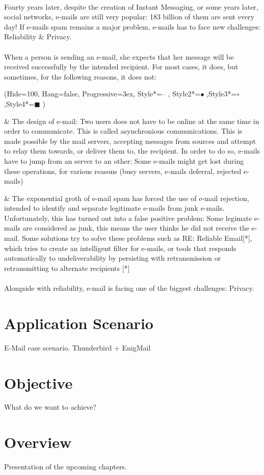 \paragraph{}
Fourty years later, despite the creation of Instant Messaging, or some years later, social networks, e-mails are still very popular: 183 billion of them are sent every day! If e-mails spam remains a major problem, e-mails has to face new challenges: Reliability \& Privacy. 
\paragraph{}
When a person is sending an e-mail, she expects that her message will be received successfully by the
intended recipient. For most cases, it does, but sometimes, for the following reasons, it does not:
\begin{easylist}[enumerate]
\ListProperties(Hide=100, Hang=false, Progressive=3ex, Style*=-- ,
Style2*=$\bullet$ ,Style3*=$\circ$ ,Style4*=\tiny$\blacksquare$ )

& The design of e-mail: Two users does not have to be online at the same time in order to communicate. This is called asynchronious communications. This is made possible by the mail servers, accepting messages from sources and attempt to relay them towards, or deliver them to, the recipient. In order to do so, e-mails have to jump from an server to an other: Some e-mails might get lost during these operations, for various reasons (busy servers, e-mails deferral, rejected e-mails)

& The exponential groth of e-mail spam has forced the use of e-mail rejection, intended to identify and separate legitimate e-mails from junk e-mails. Unfortunately, this has turned out into a false positive problem: Some legimate e-mails are considered as junk, this means the user thinks he did not receive the e-mail.
Some solutions try to solve these problems such as RE: Reliable Email[*], which tries to create an intelligent filter for e-mails, or tools that responds automatically to undeliverability by persisting with retransmission or retransmitting to alternate recipients [*]
\end{easylist}
\paragraph{}
Alongside with reliability, e-mail is facing one of the biggest challenges: Privacy. 
 
\section {Application Scenario}

E-Mail case scenario.
Thunderbird + EnigMail

\section{Objective}

What do we want to achieve?

\section{Overview}

Presentation of the upcoming chapters.